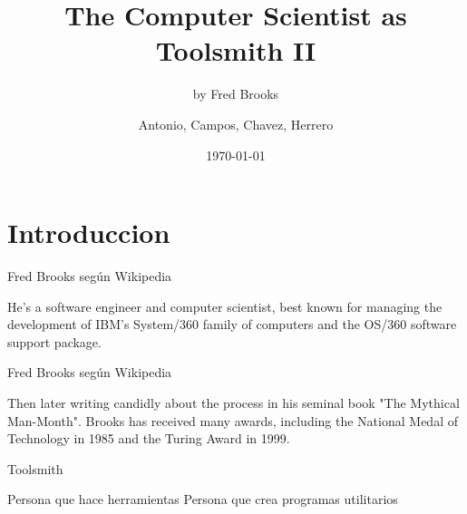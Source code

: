 \documentclass{beamer}
\title{The Computer Scientist as Toolsmith II}
\subtitle{by Fred Brooks}
\author{Antonio, Campos, Chavez, Herrero}
\institute{Ingeniería de Software II}
\date{\today}
\begin{document}
\begin{frame}
\titlepage
\end{frame}

\section{Introduccion}
\begin{frame}{Fred Brooks según Wikipedia}
\begin{center}
He's a software engineer and computer scientist, 
best known for managing the development of IBM's System/360 
family of computers and the OS/360 software support package. 
\end{center}
\end{frame}

\begin{frame}{Fred Brooks según Wikipedia}
\begin{center}
Then later writing candidly about the process in his 
seminal book 
\newline
"The Mythical Man-Month". 
\newline
Brooks has received many awards, 
including the National Medal of Technology in 1985 and the Turing Award in 1999.
\end{center}
\end{frame}
\begin{frame}{Toolsmith}
\begin{center}
Persona que hace herramientas
\newline
\newline
Persona que crea programas utilitarios
\end{center}
\end{frame}
\end{document}
